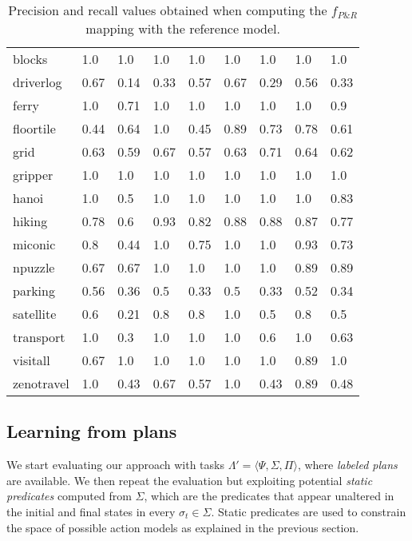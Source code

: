 \documentclass[3p,times]{elsarticle}
\newcommand{\tup}[1]{{\langle #1 \rangle}}
\begin{document}
\begin{table}[hbt!]
\begin{center}
\begin{scriptsize}
\begin{tabular}{l|l|l|l|l|l|l||l|l|}
				blocks & 1.0 & 1.0 & 1.0 & 1.0 & 1.0 & 1.0 & 1.0 & 1.0 \\
				driverlog & 0.67 & 0.14 & 0.33 & 0.57 & 0.67 & 0.29 & 0.56 & 0.33 \\
				ferry & 1.0 & 0.71 & 1.0 & 1.0 & 1.0 & 1.0 & 1.0 & 0.9 \\
				floortile & 0.44 & 0.64 & 1.0 & 0.45 & 0.89 & 0.73 & 0.78 & 0.61 \\
				grid & 0.63 & 0.59 & 0.67 & 0.57 & 0.63 & 0.71 & 0.64 & 0.62 \\
				gripper & 1.0 & 1.0 & 1.0 & 1.0 & 1.0 & 1.0 & 1.0 & 1.0 \\
				hanoi & 1.0 & 0.5 & 1.0 & 1.0 & 1.0 & 1.0 & 1.0 & 0.83 \\
				hiking & 0.78 & 0.6 & 0.93 & 0.82 & 0.88 & 0.88 & 0.87 & 0.77 \\
				miconic & 0.8 & 0.44 & 1.0 & 0.75 & 1.0 & 1.0 & 0.93 & 0.73 \\
				npuzzle & 0.67 & 0.67 & 1.0 & 1.0 & 1.0 & 1.0 & 0.89 & 0.89 \\
				parking & 0.56 & 0.36 & 0.5 & 0.33 & 0.5 & 0.33 & 0.52 & 0.34 \\
				satellite & 0.6 & 0.21 & 0.8 & 0.8 & 1.0 & 0.5 & 0.8 & 0.5 \\
				transport & 1.0 & 0.3 & 1.0 & 1.0 & 1.0 & 0.6 & 1.0 & 0.63 \\
				visitall & 0.67 & 1.0 & 1.0 & 1.0 & 1.0 & 1.0 & 0.89 & 1.0 \\
				zenotravel & 1.0 & 0.43 & 0.67 & 0.57 & 1.0 & 0.43 & 0.89 & 0.48
			\end{tabular}
		\end{scriptsize}
	\end{center}
	\caption{\small Precision and recall values obtained when computing the $f_{P\&R}$ mapping with the reference model.}
	\label{fig:observationsmap}
\end{table}



\subsection{Learning from plans}
We start evaluating our approach with tasks $\Lambda'=\tup{\Psi,\Sigma,\Pi}$, where {\em labeled plans} are available. We then repeat the evaluation but exploiting potential \emph{static predicates} computed from $\Sigma$, which are the predicates that appear  unaltered in the initial and final states in every $\sigma_t\in\Sigma$. Static predicates are used to constrain the space of possible action models as explained in the previous section.
\end{document}
